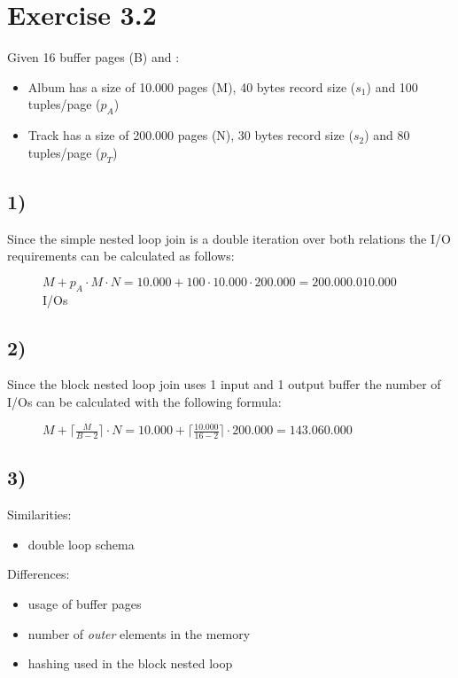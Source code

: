 \documentclass[12pt]{article}
\begin{document}
	\newpage
	
	\section*{Exercise 3.2}
	Given 16 buffer pages (B) and :
	\begin{itemize}
		\item Album has a size of 10.000 pages (M), 40 bytes record size ($s_1$) and 100 tuples/page ($p_A$)
		\item Track has a size of 200.000 pages (N), 30 bytes record size ($s_2$) and 80 tuples/page ($p_T$)
	\end{itemize}
	\subsection*{1)}		
		Since the simple nested loop join is a double iteration over both relations the I/O requirements can be calculated as follows:\\
		\begin{figure}[H]
			\centering
			$M+p_A \cdot M \cdot N = 10.000 + 100 \cdot 10.000 \cdot 200.000 = 200.000.010.000$ I/Os
		\end{figure}
	\subsection*{2)}
		Since the block nested loop join uses 1 input and 1 output buffer the number of I/Os can be calculated with the following formula:
		\begin{figure}[H]
			\centering
			$M + \lceil \frac{M}{B-2} \rceil \cdot N = 10.000 + \lceil \frac{10.000}{16-2} \rceil \cdot 200.000 = 143.060.000$
		\end{figure}
	\subsection*{3)}
		Similarities:
		\begin{itemize}
			\item double loop schema
		\end{itemize}
		Differences:
		\begin{itemize}
			\item usage of buffer pages 
			\item number of \textit{outer} elements in the memory
			\item hashing used in the block nested loop
		\end{itemize}
	
\end{document}

